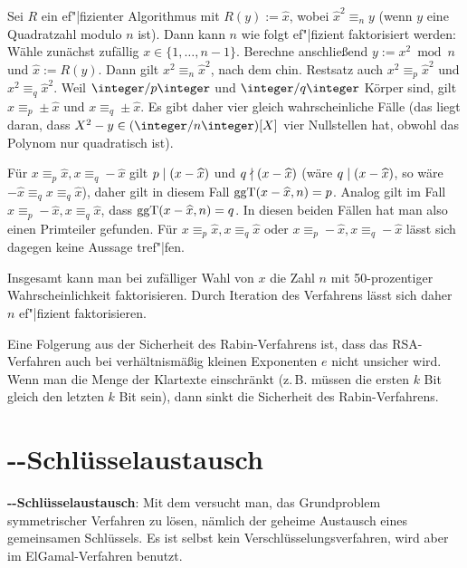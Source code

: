 \begin{Beweis}
    Sei $R$ ein ef"|fizienter Algorithmus mit $R(y) := \widehat{x}$, wobei
    $\widehat{x}^2 \equiv_n y$ (wenn $y$ eine Quadratzahl modulo $n$ ist).
    Dann kann $n$ wie folgt ef"|fizient faktorisiert werden:
    Wähle zunächst zufällig $x \in \{1, \dotsc, n - 1\}$.
    Berechne anschließend $y := x^2 \bmod n$ und $\widehat{x} := R(y)$.
    Dann gilt $x^2 \equiv_n \widehat{x}^2$, nach dem chin. Restsatz auch
    $x^2 \equiv_p \widehat{x}^2$ und $x^2 \equiv_q \widehat{x}^2$.
    Weil $\ZpZ$ und $\ZqZ$ Körper sind, gilt
    $x \equiv_p \pm\widehat{x}$ und $x \equiv_q \pm\widehat{x}$.
    Es gibt daher vier gleich wahrscheinliche Fälle
    (das liegt daran, dass $X^2 - y \in (\integer/n\integer)[X]$ vier Nullstellen hat,
    obwohl das Polynom nur quadratisch ist).

    Für $x \equiv_p \widehat{x}, x \equiv_q -\widehat{x}$
    gilt $p \mid (x - \widehat{x})$ und $q \nmid (x - \widehat{x})$
    (wäre $q \mid (x - \widehat{x})$, so wäre
    $ -\widehat{x} \equiv_q x \equiv_q \widehat{x}$),
    daher gilt in diesem Fall $\operatorname{ggT}(x - \widehat{x}, n) = p$.
    Analog gilt im Fall $x \equiv_p -\widehat{x}, x \equiv_q \widehat{x}$,
    dass $\operatorname{ggT}(x - \widehat{x}, n) = q$.
    In diesen beiden Fällen hat man also einen Primteiler gefunden.
    Für $x \equiv_p \widehat{x}, x \equiv_q \widehat{x}$ oder
    $x \equiv_p -\widehat{x}, x \equiv_q -\widehat{x}$ lässt sich dagegen keine
    Aussage tref"|fen.

    Insgesamt kann man bei zufälliger Wahl von $x$ die Zahl $n$ mit 50-prozentiger
    Wahrscheinlichkeit faktorisieren.
    Durch Iteration des Verfahrens lässt sich daher $n$ ef"|fizient faktorisieren.
\end{Beweis}

Eine Folgerung aus der Sicherheit des Rabin-Verfahrens ist, dass das RSA-Verfahren auch bei
verhältnismäßig kleinen Exponenten $e$ nicht unsicher wird.
Wenn man die Menge der Klartexte einschränkt (z.\,B. müssen die ersten $k$ Bit gleich den
letzten $k$ Bit sein), dann sinkt die Sicherheit des Rabin-Verfahrens.

\pagebreak

\section{%
    --Schlüsselaustausch%
}

\textbf{--Schlüsselaustausch}:
Mit dem  versucht man, das Grundproblem
symmetrischer Verfahren zu lösen,
nämlich der geheime Austausch eines gemeinsamen Schlüssels.
Es ist selbst kein Verschlüsselungsverfahren, wird aber im ElGamal-Verfahren benutzt.

